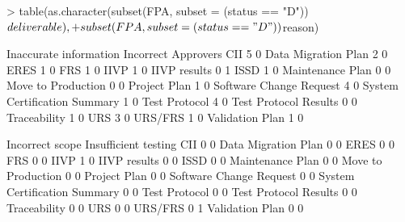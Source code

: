 \documentclass{article}
\begin{document}
\begin{Schunk}
\begin{Sinput}
> table(as.character(subset(FPA, subset = (status == "D"))$deliverable),
+       subset(FPA, subset = (status == "D"))$reason)
\end{Sinput}
\begin{Soutput}
                               Inaccurate information Incorrect Approvers
  CII                                               5                   0
  Data Migration Plan                               2                   0
  ERES                                              1                   0
  FRS                                               1                   0
  IIVP                                              1                   0
  IIVP results                                      0                   1
  ISSD                                              1                   0
  Maintenance Plan                                  0                   0
  Move to Production                                0                   0
  Project Plan                                      1                   0
  Software Change Request                           4                   0
  System Certification Summary                      1                   0
  Test Protocol                                     4                   0
  Test Protocol Results                             0                   0
  Traceability                                      1                   0
  URS                                               3                   0
  URS/FRS                                           1                   0
  Validation Plan                                   1                   0
                              
                               Incorrect scope Insufficient testing
  CII                                        0                    0
  Data Migration Plan                        0                    0
  ERES                                       0                    0
  FRS                                        0                    0
  IIVP                                       1                    0
  IIVP results                               0                    0
  ISSD                                       0                    0
  Maintenance Plan                           0                    0
  Move to Production                         0                    0
  Project Plan                               0                    0
  Software Change Request                    0                    0
  System Certification Summary               0                    0
  Test Protocol                              0                    0
  Test Protocol Results                      0                    0
  Traceability                               0                    0
  URS                                        0                    0
  URS/FRS                                    0                    1
  Validation Plan                            0                    0
                              

\end{Soutput}
\end{Schunk}
\end{document}
